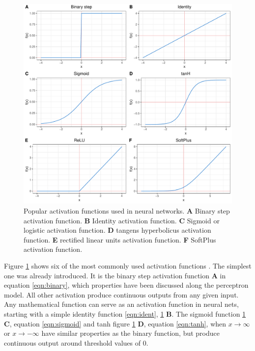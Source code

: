 \begin{figure}[H]
\centering
\includegraphics[height=.55\textheight, width=.85\textwidth]{Figures/activation}
\decoRule
\caption[Popular activation functions for neural networks]{Popular activation functions used in neural networks.
 \textbf{A} Binary step activation function.
 \textbf{B} Identity activation function.
 \textbf{C} Sigmoid or logistic activation function.
 \textbf{D} tangens hyperbolicus activation function.
 \textbf{E} rectified linear units activation function.
 \textbf{F} SoftPlus activation function.}
\label{fig:activation}
\end{figure}


Figure \ref{fig:activation} shows six of the most commonly used activation functions
\cite{warner1996understanding}. The simplest one was already introduced. It is the binary step activation
function \textbf{A} in equation \ref{eqn:binary}, which properties have been discussed along the perceptron
model. All other activation produce continuous outputs from any given input. \\
Any mathematical function can serve as an activation function in neural nets, starting with a simple identity
function \ref{eqn:ident}, \ref{fig:activation} \textbf{B}. The sigmoid function \ref{fig:activation}
\textbf{C}, equation \ref{eqn:sigmoid} and tanh figure \ref{fig:activation} \textbf{D}, equation
\ref{eqn:tanh}, when $x \rightarrow \infty$ or $x \rightarrow -\infty$  have similar properties as the
binary function, but produce continuous output around threshold values of 0.

